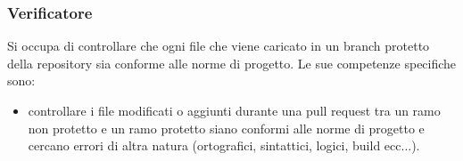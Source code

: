 \subsubsection{Verificatore}
Si occupa di controllare che ogni file che viene caricato in un branch protetto della repository sia conforme alle norme di progetto. Le sue competenze specifiche sono:
\begin{itemize}
	\item controllare i file modificati o aggiunti durante una pull request tra un ramo non protetto e un ramo protetto siano conformi alle norme di progetto e cercano errori di altra natura (ortografici, sintattici, logici, build ecc...).
\end{itemize}



